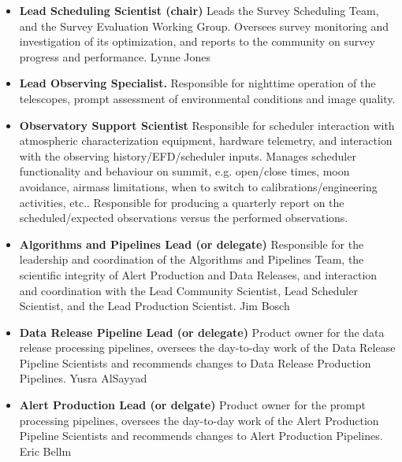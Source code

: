\documentclass[OPS,authoryear,toc]{lsstdoc}
\begin{document}
\begin{itemize}
\item {
{\bf Lead Scheduling Scientist (chair)}
Leads the Survey Scheduling Team, and the Survey Evaluation Working Group. Oversees survey monitoring and investigation of its optimization, and reports to the community on survey progress and performance. 
 Lynne Jones
}
\item{
{\bf Lead Observing Specialist.}
 Responsible for nighttime operation of the telescopes,   prompt assessment of environmental conditions and image quality.  
}
\item{
{\bf Observatory Support Scientist}
 Responsible for scheduler interaction with atmospheric characterization equipment, hardware telemetry, and interaction with the observing history/EFD/scheduler inputs. Manages scheduler functionality and behaviour on summit, e.g. open/close times, moon avoidance, airmass limitations, when to switch to calibrations/engineering activities, etc.. Responsible for producing a quarterly report on the scheduled/expected observations versus the performed observations.  
}
\item{
{\bf Algorithms and Pipelines Lead (or delegate)}
 Responsible for the leadership and coordination of the Algorithms and Pipelines Team, the scientific integrity of Alert Production and Data Releases, and interaction and coordination with the Lead Community Scientist, Lead Scheduler Scientist, and the Lead Production Scientist. 
 Jim Bosch
}
\item{
{\bf Data Release Pipeline Lead (or delegate)}
 Product owner for the data release processing pipelines,  oversees the day-to-day work of the Data Release Pipeline Scientists and recommends changes to Data Release Production Pipelines.
 Yusra AlSayyad
}
\item{
{\bf Alert Production Lead (or delgate)}
 Product owner for the  prompt processing pipelines, oversees the day-to-day work of the Alert Production Pipeline Scientists and recommends changes to Alert Production Pipelines.
 Eric Bellm
}
\end{itemize}
\end{document}
